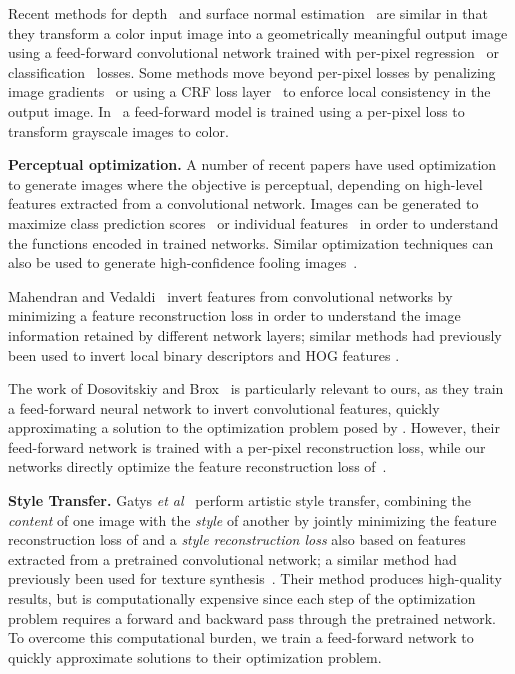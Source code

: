 \documentclass[runningheads]{llncs}
\newcommand{\etal}{\textit{et al}}
\begin{document}
Recent methods for depth~\cite{eigen2015predicting,eigen2014depth,liu2015deep}
and surface normal estimation~\cite{eigen2015predicting,wang2015designing} are similar in
that they transform a color input image into a geometrically meaningful output image
using a feed-forward convolutional network trained with per-pixel
regression~\cite{eigen2014depth,eigen2015predicting} or classification~\cite{wang2015designing}
losses. Some methods move beyond per-pixel losses by penalizing image
gradients~\cite{eigen2015predicting} or using a CRF loss layer~\cite{liu2015deep} to
enforce local consistency in the output image. In~\cite{cheng2015deep} a feed-forward model
is trained using a per-pixel loss to transform grayscale images to color.

\textbf{Perceptual optimization.}
A number of recent papers have used optimization to generate images where the objective
is perceptual, depending on high-level features extracted from a convolutional network.
Images can be generated to maximize class prediction
scores~\cite{simonyan2013deep,yosinski2015understanding} or individual
features~\cite{yosinski2015understanding} in order to understand the functions encoded in
trained networks. Similar optimization techniques can also be used to generate high-confidence
fooling images~\cite{szegedy2013intriguing,nguyen2015deep}.

Mahendran and Vedaldi~\cite{mahendran15understanding} invert features from convolutional
networks by minimizing a feature reconstruction loss in order to understand the image
information retained by different network layers; similar methods had previously been used
to invert local binary descriptors \cite{d2012beyond} and HOG features
\cite{vondrick2013hoggles}.

The work of Dosovitskiy and Brox~\cite{dosovitskiy2015inverting} is particularly relevant
to ours, as they train a feed-forward neural network to invert convolutional features, quickly
approximating a solution to the optimization problem posed by \cite{mahendran15understanding}.
However, their feed-forward network is trained with a per-pixel reconstruction loss, while
our networks directly optimize the feature reconstruction loss
of~\cite{mahendran15understanding}.

\textbf{Style Transfer.}
Gatys \etal~\cite{gatys2015neural} perform artistic style transfer, combining
the \emph{content} of one image with the \emph{style} of another by jointly minimizing the
feature reconstruction loss of \cite{mahendran15understanding} and a
\emph{style reconstruction loss} also based on features extracted from a pretrained
convolutional network; a similar method had previously been used for texture synthesis~\cite{Gatys2015b}.
Their method produces high-quality results, but is computationally
expensive since each step of the optimization problem requires a forward and backward pass
through the pretrained network. To overcome this computational burden, we train a feed-forward
network to quickly approximate solutions to their optimization problem.
\end{document}
